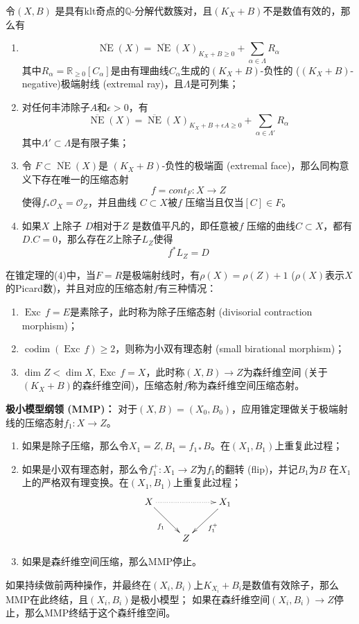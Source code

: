 \begin{theorem}[锥定理]\label{conethm}

令$(X,B)$ 是具有klt奇点的$\mathbb{Q}$-分解代数簇对，且$(K_{X}+B)$不是数值有效的，那么有
\begin{enumerate}
  \item
    \[ \overline{\operatorname{NE}}(X)=\overline{\operatorname{NE}}(X)_{K_{X}+B\geqslant 0} +\sum_{\alpha \in\Lambda} R_{\alpha}\] 
          其中$R_{\alpha}=\mathbb{R}_{\geqslant 0}[C_{\alpha}]$是由有理曲线$C_{\alpha}$生成的$(K_{X}+B) $-负性的 ($(K_{X}+B)$-negative)极端射线 (extremal ray)，且$\Lambda$是可列集；
  \item 对任何丰沛除子$A$和$ \epsilon >0 $，有
        \[ \overline{\operatorname{NE}}(X)=\overline{\operatorname{NE}}(X)_{K_{X}+B+\epsilon A\geqslant 0} +\sum_{\alpha \in\Lambda'}R_{\alpha} \]
        其中$\Lambda' \subset \Lambda$是有限子集；
  \item 令 $F \subset \overline{\operatorname{NE}}(X)$是 $(K_{X}+B)$-负性的极端面 (extremal face)，那么同构意义下存在唯一的压缩态射
    \[ f=cont_{F}:X \to Z \]
    使得$f_{*}\mathcal{O}_{X}=\mathcal{O}_{Z}$，并且曲线 $C \subset X$被$f$ 压缩当且仅当$[C] \in F$。 
  \item 如果$X$ 上除子 $D$相对于$Z$ 是数值平凡的，即任意被$f$ 压缩的曲线$C \subset X$，都有$D.C=0$，那么存在$Z$上除子$L_{Z} $使得
    \[ f^{*}L_{Z} = D \]
\end{enumerate}
\end{theorem}
在锥定理的(4)中，当$F=R$是极端射线时，有$\rho(X)=\rho(Z)+1$ ($\rho(X)$表示$X$ 的Picard数)，并且对应的压缩态射$f$有三种情况：
\begin{enumerate}
  \item $\operatorname{Exc}\,f=E$是素除子，此时称为除子压缩态射 (divisorial contraction morphism)；
  \item $\operatorname{codim }(\operatorname{Exc}\,f) \geqslant 2$，则称为小双有理态射 (small birational morphism)；
  \item $\dim Z < \dim X, \operatorname{Exc}\,f=X$，此时称$(X,B)\to Z$为森纤维空间 (关于$ (K_{X}+B) $的森纤维空间)，压缩态射$f$称为森纤维空间压缩态射。
\end{enumerate}
\textbf{极小模型纲领 (MMP)：}
对于$(X,B)=(X_{0},B_{0})$，应用锥定理做关于极端射线的压缩态射$f_{1}:X\to Z$。
\begin{enumerate}
  \item 如果是除子压缩，那么令$X_{1}=Z,B_{1}=f_{1*}B$。在$(X_{1},B_{1})$上重复此过程；
  \item 如果是小双有理态射，那么令$f^{+}_{1}:X_{1}\to Z$为$f_{1}$的翻转 (flip)，并记$B_{1}$为$B$ 在$X_{1}$上的严格双有理变换。在$(X_{1},B_{1})$上重复此过程；
    \[ \xymatrix{
        X\ar[rd]_{f_{1}} \ar@{.>}[rr] & & X_{1}\ar[ld]^{f_{1}^{+}} \\
      & Z & } \]
  \item 如果是森纤维空间压缩，那么MMP停止。
\end{enumerate}
如果持续做前两种操作，并最终在$(X_{i},B_{i})$上$K_{X_{i}}+B_{i}$是数值有效除子，那么MMP在此终结，且$(X_{i},B_{i})$是极小模型；
如果在森纤维空间$(X_{i},B_{i})\to Z$停止，那么MMP终结于这个森纤维空间。


